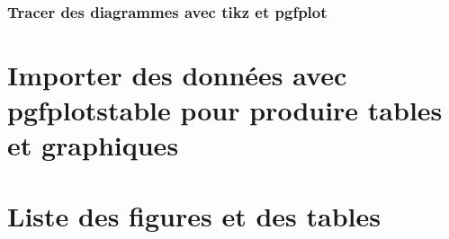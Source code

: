 \documentclass[12pt,a4paper]{article}
\begin{document}
\begin{tikzpicture}
\end{tikzpicture}


\subsubsection{Tracer des diagrammes avec tikz  et pgfplot}



\section{Importer des données avec pgfplotstable pour produire tables et graphiques}






\begin{tikzpicture}
\end{tikzpicture}


\begin{tikzpicture}[xscale=1.5]
\end{tikzpicture}






\section{Liste des figures et des tables}
\end{document}
